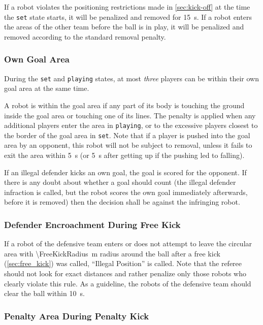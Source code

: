 If a robot violates the positioning restrictions made in \cref{sec:kick-off} at the time the \texttt{set} state starts, it will be penalized and removed for \qty{15}{\second}.
If a robot enters the areas of the other team before the ball is in play, it will be penalized and removed according to the standard removal penalty.

\subsubsection{Own Goal Area}
\label{sec:ip_own_goal_area}

During the \texttt{set} and \texttt{playing} states, at most \textit{three} players can be within their own goal area at the same time.

A robot is within the goal area if any part of its body is touching the ground inside the goal area or touching one of its lines.
The penalty is applied when any additional players enter the area in \texttt{playing}, or to the excessive players closest to the border of the goal area in \texttt{set}.
Note that if a player is pushed into the goal area by an opponent, this robot will not be subject to removal, unless it fails to exit the area within \qty{5}{\second} (or \qty{5}{\second} after getting up if the pushing led to falling).

If an illegal defender kicks an own goal, the goal is scored for the opponent.
If there is any doubt about whether a goal should count (\eg the illegal defender infraction is called, but the robot scores the own goal immediately afterwards, before it is removed) then the decision shall be against the infringing robot.

\subsubsection{Defender Encroachment During Free Kick}
\label{sec:ip_free_kick}

If a robot of the defensive team enters or does not attempt to leave the circular area with \qty{\FreeKickRadius}{\metre} radius around the ball after a free kick (\cf \cref{sec:free_kick}) was called, ``Illegal Position'' is called.
Note that the referee should not look for exact distances and rather penalize only those robots who clearly violate this rule.
As a guideline, the robots of the defensive team should clear the ball within \qty{10}{\second}.

\subsubsection{Penalty Area During Penalty Kick}
\label{sec:ip_penalty_kick}


